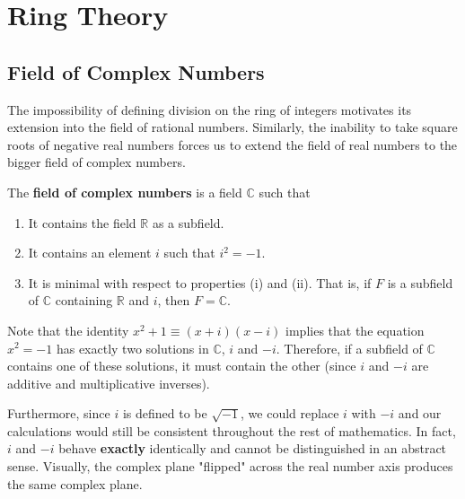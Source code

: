 \documentclass{article}
\begin{document}
\section{Ring Theory}

  \subsection{Field of Complex Numbers}

    The impossibility of defining division on the ring of integers motivates its extension into the field of rational numbers. Similarly, the inability to take square roots of negative real numbers forces us to extend the field of real numbers to the bigger field of complex numbers. 

    \begin{definition}
      The \textbf{field of complex numbers} is a field $\mathbb{C}$ such that 
      \begin{enumerate}
        \item It contains the field $\mathbb{R}$ as a subfield. 
        \item It contains an element $i$ such that $i^2 = -1$.
        \item It is minimal with respect to properties (i) and (ii). That is, if $F$ is a subfield of $\mathbb{C}$ containing $\mathbb{R}$ and $i$, then $F = \mathbb{C}$. 
      \end{enumerate}
    \end{definition}

    Note that the identity $x^2 + 1 \equiv (x + i) (x - i)$ implies that the equation $x^2 = -1$ has exactly two solutions in $\mathbb{C}$, $i$ and $-i$. Therefore, if a subfield of $\mathbb{C}$ contains one of these solutions, it must contain the other (since $i$ and $-i$ are additive and multiplicative inverses). 

    Furthermore, since $i$ is defined to be $\sqrt{-1}$, we could replace $i$ with $-i$ and our calculations would still be consistent throughout the rest of mathematics. In fact, $i$ and $-i$ behave \textbf{exactly} identically and cannot be distinguished in an abstract sense. Visually, the complex plane "flipped" across the real number axis produces the same complex plane. 
\end{document}
